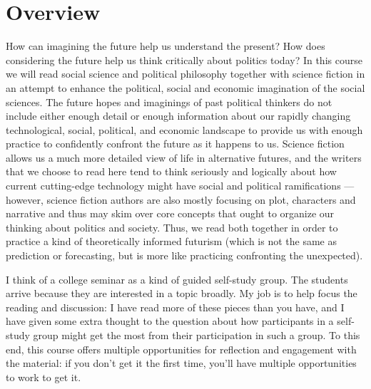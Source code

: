 \documentclass[letterpaper]{inzane_syllabus} %
\begin{document}

\makeprofile %

\section{Overview}

How can imagining the future help us understand the present? How does
considering the future help us think critically about politics today?  In this
course we will read social science and political philosophy together with
science fiction in an attempt to enhance the political, social and economic
imagination of the social sciences. The future hopes and imaginings of past
political thinkers do not include either enough detail or enough information
about our rapidly changing technological, social, political, and economic
landscape to provide us with enough practice to confidently confront the
future as it happens to us. Science fiction allows us a much more
detailed view of life in alternative futures, and the writers that we choose
to read here tend to think seriously and logically about how current cutting-edge technology might have social and political ramifications --- however,
science fiction authors are also mostly focusing on plot, characters and narrative and thus may
skim over core concepts that ought to organize our thinking about politics and
society. Thus, we read both together in order to practice a kind of
theoretically informed futurism (which is not the same as prediction or
forecasting, but is more like practicing confronting the unexpected).

I think of a college seminar as a kind of guided self-study group. The students
arrive because they are interested in a topic broadly. My job is to help focus
the reading and discussion: I have read more of these pieces than you have, and
I have given some extra thought to the question about how participants in a
self-study group might get the most from their participation in such a group. To
this end, this course offers multiple opportunities for reflection and
engagement with the material: if you don't get it the first time, you'll have
multiple opportunities to work to get it.
\end{document}
